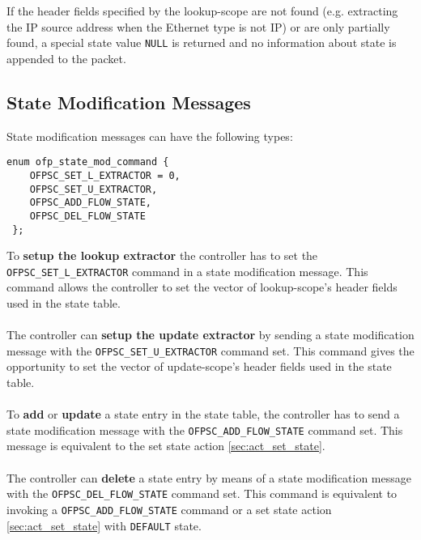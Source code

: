 If the header fields specified by the lookup-scope are not found (e.g. extracting the IP source address when the Ethernet type is not IP) or are only partially found, a special state value \texttt{NULL} is returned and no information about state is appended to the packet.

\subsection{State Modification Messages}

\label{sec:msg_set_state}

State modification messages can have the following types:
\scriptsize\begin{verbatim}
enum ofp_state_mod_command {
    OFPSC_SET_L_EXTRACTOR = 0,
    OFPSC_SET_U_EXTRACTOR,
    OFPSC_ADD_FLOW_STATE,   
    OFPSC_DEL_FLOW_STATE
 };
\end{verbatim}\normalsize



\noindent
To \textbf{setup the lookup extractor} the controller has to set the \texttt{OFPSC\_SET\_L\_EXTRACTOR} command in a state modification message. 
This command allows the controller to set the vector of lookup-scope's header fields used in the state table.
\\\\The controller can \textbf{setup the update extractor} by sending a state modification message with the \texttt{OFPSC\_SET\_U\_EXTRACTOR} command set.
This command gives the opportunity to set the vector of update-scope's header fields used in the state table.
\\\\To \textbf{add} or \textbf{update} a state entry in the state table, the controller has to send a state modification message with the \texttt{OFPSC\_ADD\_FLOW\_STATE} command set. This message is equivalent to the set state action \ref{sec:act_set_state}.
\\\\The controller can \textbf{delete} a state entry by means of a state modification message with the \texttt{OFPSC\_DEL\_FLOW\_STATE} command set. This command is equivalent to invoking a \texttt{OFPSC\_ADD\_FLOW\_STATE} command or a set state action \ref{sec:act_set_state} with \texttt{DEFAULT} state.





